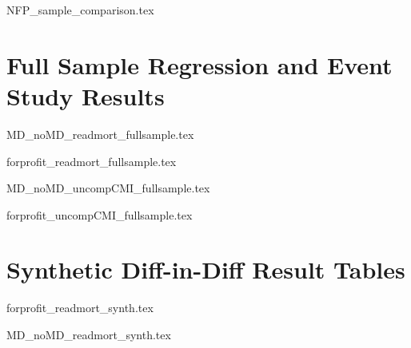 \documentclass[12pt]{article}
\begin{document}
{NFP_sample_comparison.tex}

\section{Full Sample Regression and Event Study Results}\label{app:fullsample}

{MD_noMD_readmort_fullsample.tex}

{forprofit_readmort_fullsample.tex}

{MD_noMD_uncompCMI_fullsample.tex}

{forprofit_uncompCMI_fullsample.tex}

\section{Synthetic Diff-in-Diff Result Tables}

{forprofit_readmort_synth.tex}

{MD_noMD_readmort_synth.tex}


    

    

    

    

    

    

	
	
	
\end{document}
